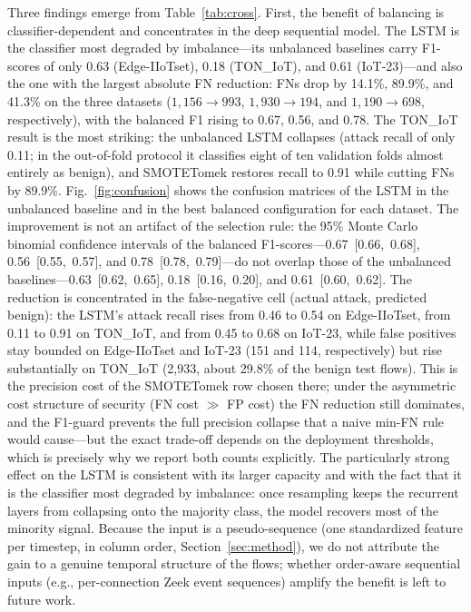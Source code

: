 ﻿\documentclass[journal]{IEEEtran}
\begin{document}
Three findings emerge from Table~\ref{tab:cross}. First, the benefit of balancing is classifier-dependent and concentrates in the deep sequential model. The LSTM is the classifier most degraded by imbalance---its unbalanced baselines carry F1-scores of only 0.63 (Edge-IIoTset), 0.18 (TON\_IoT), and 0.61 (IoT-23)---and also the one with the largest absolute FN reduction: FNs drop by 14.1\%, 89.9\%, and 41.3\% on the three datasets ($1{,}156\rightarrow993$, $1{,}930\rightarrow194$, and $1{,}190\rightarrow698$, respectively), with the balanced F1 rising to 0.67, 0.56, and 0.78. The TON\_IoT result is the most striking: the unbalanced LSTM collapses (attack recall of only 0.11; in the out-of-fold protocol it classifies eight of ten validation folds almost entirely as benign), and SMOTETomek restores recall to 0.91 while cutting FNs by 89.9\%. Fig.~\ref{fig:confusion} shows the confusion matrices of the LSTM in the unbalanced baseline and in the best balanced configuration for each dataset. The improvement is not an artifact of the selection rule: the 95\% Monte Carlo binomial confidence intervals of the balanced F1-scores---0.67~[0.66,~0.68], 0.56~[0.55,~0.57], and 0.78~[0.78,~0.79]---do not overlap those of the unbalanced baselines---0.63~[0.62,~0.65], 0.18~[0.16,~0.20], and 0.61~[0.60,~0.62]. The reduction is concentrated in the false-negative cell (actual attack, predicted benign): the LSTM's attack recall rises from 0.46 to 0.54 on Edge-IIoTset, from 0.11 to 0.91 on TON\_IoT, and from 0.45 to 0.68 on IoT-23, while false positives stay bounded on Edge-IIoTset and IoT-23 (151 and 114, respectively) but rise substantially on TON\_IoT (2{,}933, about 29.8\% of the benign test flows). This is the precision cost of the SMOTETomek row chosen there; under the asymmetric cost structure of security (FN cost $\gg$ FP cost) the FN reduction still dominates, and the F1-guard prevents the full precision collapse that a naive min-FN rule would cause---but the exact trade-off depends on the deployment thresholds, which is precisely why we report both counts explicitly. The particularly strong effect on the LSTM is consistent with its larger capacity and with the fact that it is the classifier most degraded by imbalance: once resampling keeps the recurrent layers from collapsing onto the majority class, the model recovers most of the minority signal. Because the input is a pseudo-sequence (one standardized feature per timestep, in column order, Section~\ref{sec:method}), we do not attribute the gain to a genuine temporal structure of the flows; whether order-aware sequential inputs (e.g., per-connection Zeek event sequences) amplify the benefit is left to future work.
\end{document}
